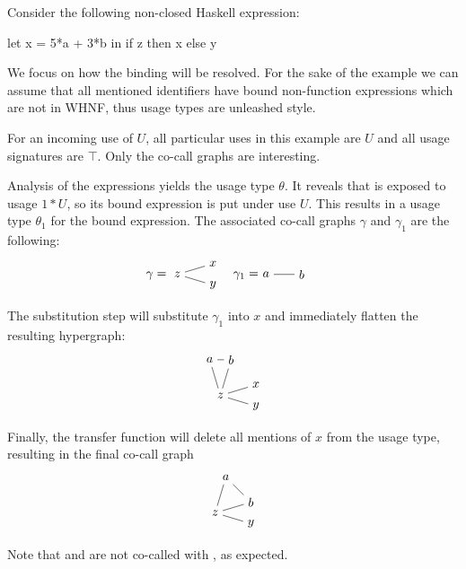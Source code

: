 \begin{example}
  Consider the following non-closed Haskell expression:
  \begin{haskellcode}
    let x = 5*a + 3*b
    in if z
       then x
       else y
  \end{haskellcode}

  We focus on how the  binding will be resolved. For the sake of the example we can assume that all mentioned identifiers have bound non-function expressions which are not in WHNF, thus usage types are unleashed  style.

  For an incoming use of $U$, all particular uses in this example are $U$ and all usage signatures are $\top$.
  Only the co-call graphs are interesting.

  Analysis of the  expressions yields the usage type $\theta$. 
  It reveals that  is exposed to usage $1*U$, so its bound expression is put under use $U$.
  This results in a usage type $\theta_1$ for the bound expression.
  The associated co-call graphs $\gamma$ and $\gamma_1$ are the following:
  \begin{align*}
    \gamma &= 
    \begin{tikzpicture}[baseline={(0.base)}]
      \node (0) {$z$};
      \node at (1,0.3) (1) {$x$};
      \node at (1,-0.3) (2) {$y$};
      \draw (0) -- (1);
      \draw (0) -- (2);
    \end{tikzpicture}
    &
    \gamma_1 =&
    \begin{tikzpicture}[baseline={(0.base)}]
      \node (0) {$a$};
      \node (1) at (1,0) {$b$};
      \draw (0) -- (1);
    \end{tikzpicture}
  \end{align*}

  The substitution step will substitute $\gamma_1$ into $x$ and immediately flatten the resulting hypergraph:
  \begin{align*}
    \begin{tikzpicture}[baseline={(0.base)}]
      \node (0) {$z$};
      \node at (1,0.3) (1) {$x$};
      \node at (1,-0.3) (2) {$y$};
      \node at (-0.3, 1) (3) {$a$};
      \node at (0.3, 1) (4) {$b$};
      \draw (3) -- (4);
      \draw (0) -- (1);
      \draw (0) -- (3);
      \draw (0) -- (4);
      \draw (0) -- (2);
    \end{tikzpicture}
  \end{align*}

  Finally, the transfer function will delete all mentions of $x$ from the usage type, resulting in the final co-call graph
  \begin{align*}
    \begin{tikzpicture}[baseline={(0.base)}]
      \node (0) {$z$};
      \node at (1,-0.3) (2) {$y$};
      \node at (0.3, 1) (3) {$a$};
      \node at (1, 0.3) (4) {$b$};
      \draw (3) -- (4);
      \draw (0) -- (3);
      \draw (0) -- (4);
      \draw (0) -- (2);
    \end{tikzpicture}
  \end{align*}

  Note that  and  are not co-called with , as expected.
\end{example}

